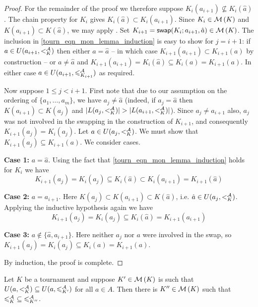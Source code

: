 \begin{proof}
    For the remainder of the proof we therefore suppose $K_i(a_{i+1})
    \not\subseteq K_i(\hat{a})$. The chain property for $K_i$ gives
    $K_i(\hat{a}) \subset K_i(a_{i+1})$. Since $K_i \in \operatorname{\mathcal{M}}\left({K}\right)$ and
    $K(a_{i+1}) \subset K(\hat{a})$, we may apply
    . Set $K_{i+1} =
    \mathsf{swap}({K_i}; {a_{i+1}}, {\hat{a}}) \in \operatorname{\mathcal{M}}\left({K}\right)$. The inclusion in
    \cref{tourn_eqn_mon_lemma_induction} is easy to show for $j=i+1$: if $a \in
    U(a_{i+1}, {<^{\mathcal{A}}_K})$ then either $a = \hat{a}$ -- in which case
    $K_{i+1}(a_{i+1}) \subset K_{i+1}(a)$ by construction -- or $a \ne \hat{a}$
    and $K_{i+1}(a_{i+1}) = K_i(\hat{a}) \subseteq K_i(a) = K_{i+1}(a)$. In
    either case $a \in U(a_{i+1}, {\leqslant^{\mathcal{A}}_{K_{i+1}}})$ as required.

    Now suppose $1 \le j < i + 1$. First note that due to our assumption on the
    ordering of $\{a_1,\ldots,a_m\}$, we have $a_j \ne \hat{a}$ (indeed, if
    $a_j = \hat{a}$ then $K(a_{i+1}) \subset K(a_j)$ and $|L(a_j, {<^{\mathcal{A}}_K})| >
    |L(a_{i+1}, {<^{\mathcal{A}}_K})|$). Since $a_j \ne a_{i+1}$ also, $a_j$ was not
    involved in the swapping in the construction of $K_{i+1}$, and consequently
    $K_{i+1}(a_j) = K_i(a_j)$. Let $a \in U(a_j, {<^{\mathcal{A}}_K})$. We must show that
    $K_{i+1}(a_j) \subseteq K_{i+1}(a)$. We consider cases.

    \textbf{Case 1:} $a = \hat{a}$. Using the fact that
    \cref{tourn_eqn_mon_lemma_induction} holds for $K_i$ we have
    \[
        K_{i+1}(a_j)
        = K_i(a_j)
        \subseteq K_i(\hat{a})
        \subset K_i(a_{i+1})
        = K_{i+1}(\hat{a})
    \]

    \textbf{Case 2:} $a = a_{i+1}$. Here $K(a_j) \subset K(a_{i+1}) \subset
    K(\hat{a})$, i.e. $\hat{a} \in U(a_j, {<^{\mathcal{A}}_K})$. Applying the inductive
    hypothesis again we have
    \[
        K_{i+1}(a_j)
        = K_i(a_j)
        \subseteq K_i(\hat{a})
        = K_{i+1}(a_{i+1})
    \]

    \textbf{Case 3:} $a \notin \{\hat{a}, a_{i+1}\}$. Here neither $a_j$ nor
    $a$ were involved in the swap, so $K_{i+1}(a_j) = K_i(a_j) \subseteq K_i(a)
    = K_{i+1}(a)$.

    By induction, the proof is complete.
\end{proof}

\begin{lemma}
    \label{tourn_result_chainmin_mon_extend_full}
    Let $K$ be a tournament and suppose $K' \in \operatorname{\mathcal{M}}\left({K}\right)$ is such that $U(a,
    {<^{\mathcal{A}}_K}) \subseteq U(a, {\leqslant^{\mathcal{A}}_{K'}})$ for all $a \in A$. Then there is
    $K'' \in \operatorname{\mathcal{M}}\left({K}\right)$ such that ${\leqslant^{\mathcal{A}}_K} \subseteq {\leqslant^{\mathcal{A}}_{K''}}$.


\end{lemma}

